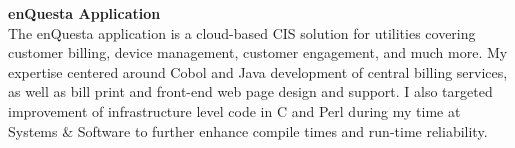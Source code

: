 \documentclass{res}
\begin{document}
\begin{resume}
\vspace{-5pt}

        {\bf enQuesta Application} \hfill \vspace{5pt} \\
           The enQuesta application is a cloud-based CIS solution for utilities covering customer billing, device management, customer engagement, and much more. My expertise centered around Cobol and Java development of central billing services, as well as bill print and front-end web page design and support. I also targeted improvement of infrastructure level code in C and Perl during my time at Systems \& Software to further enhance compile times and run-time reliability.

            
\vspace{-5pt}

\end{resume}
\end{document}
